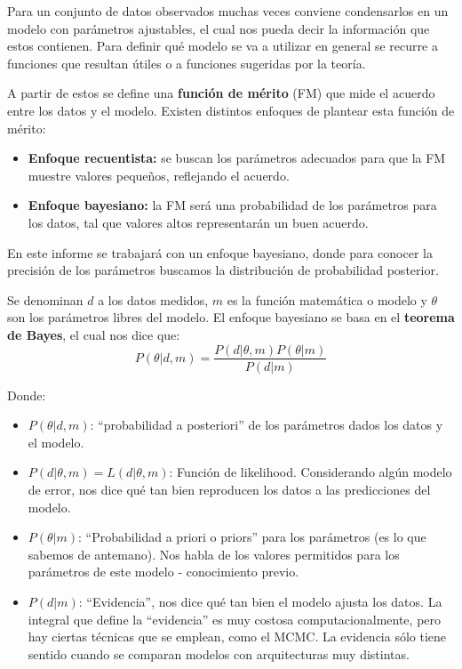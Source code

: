 \documentclass[twocolumn]{article}
\begin{document}
Para un conjunto de datos observados muchas veces conviene condensarlos en un modelo con parámetros ajustables, el cual nos pueda decir la información que estos contienen. Para definir qué modelo se va a utilizar en general se recurre a funciones que resultan útiles o a funciones sugeridas por la teoría.

\medskip

A partir de estos se define una \textbf{función de mérito} (FM) que mide el acuerdo entre los datos y el modelo. Existen distintos enfoques de plantear esta función de mérito: 

\begin{itemize}
\item \textbf{Enfoque recuentista:} se buscan los parámetros adecuados para que la FM muestre valores pequeños, reflejando el acuerdo.
\item \textbf{Enfoque bayesiano:} la FM será una probabilidad de los parámetros para los datos, tal que valores altos representarán un buen acuerdo.
\end{itemize} 

En este informe se trabajará con un enfoque bayesiano, donde para conocer la precisión de los parámetros buscamos la distribución de probabilidad posterior.

\medskip

Se denominan $d$ a los datos medidos, $m$ es la función matemática o modelo y $\theta$ son los parámetros libres del modelo. El enfoque bayesiano se basa en el \textbf{teorema de Bayes}, el cual nos dice que: 
\begin{equation}
P(\theta|d,m) = \frac{P(d|\theta,m)P(\theta|m)}{P(d|m)}
\end{equation}

Donde: 
\begin{itemize}
\item $P(\theta|d,m)$: ``probabilidad a posteriori'' de los parámetros dados los datos y el modelo.
\item $P(d|\theta,m) = L(d|\theta,m)$: Función de likelihood. Considerando algún modelo de error, nos dice qué tan bien reproducen los datos a las predicciones del modelo.
\item $P(\theta|m)$: ``Probabilidad a priori o priors'' para los parámetros (es lo que sabemos de antemano). Nos habla de los valores permitidos para los parámetros de este modelo - conocimiento previo.
\item $P(d|m)$: ``Evidencia'', nos dice qué tan bien el modelo ajusta los datos. La integral que define la ``evidencia'' es muy costosa computacionalmente, pero hay ciertas técnicas que se emplean, como el MCMC. La evidencia sólo tiene sentido cuando se comparan modelos con arquitecturas muy distintas.
\end{itemize}
\end{document}
